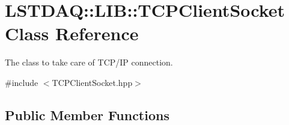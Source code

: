 \hypertarget{class_l_s_t_d_a_q_1_1_l_i_b_1_1_t_c_p_client_socket}{}\section{L\+S\+T\+D\+A\+Q\+:\+:L\+I\+B\+:\+:T\+C\+P\+Client\+Socket Class Reference}
\label{class_l_s_t_d_a_q_1_1_l_i_b_1_1_t_c_p_client_socket}


The class to take care of T\+C\+P/\+I\+P connection.  




{\ttfamily \#include $<$T\+C\+P\+Client\+Socket.\+hpp$>$}

\subsection*{Public Member Functions}
